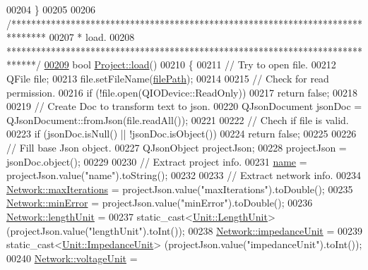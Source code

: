 \begin{DoxyCode}
00204 \}
00205 
00206 \textcolor{comment}{/*******************************************************************************}
00207 \textcolor{comment}{ * load.}
00208 \textcolor{comment}{ ******************************************************************************/}
\hypertarget{project_8cpp_source_l00209}{}\hyperlink{class_project_a1e373892a0383371132ce68fa5f8813d}{00209} \textcolor{keywordtype}{bool} \hyperlink{class_project_a1e373892a0383371132ce68fa5f8813d}{Project::load}()
00210 \{
00211   \textcolor{comment}{// Try to open file.}
00212   QFile file;
00213   file.setFileName(\hyperlink{class_project_a79f30adcefd0b72bd4ac7db724bc9531}{filePath});
00214 
00215   \textcolor{comment}{// Check for read permission.}
00216   \textcolor{keywordflow}{if} (!file.open(QIODevice::ReadOnly))
00217     \textcolor{keywordflow}{return} \textcolor{keyword}{false};
00218 
00219   \textcolor{comment}{// Create Doc to transform text to json.}
00220   QJsonDocument jsonDoc = QJsonDocument::fromJson(file.readAll());
00221 
00222   \textcolor{comment}{// Chech if file is valid.}
00223   \textcolor{keywordflow}{if} (jsonDoc.isNull() || !jsonDoc.isObject())
00224     \textcolor{keywordflow}{return} \textcolor{keyword}{false};
00225 
00226   \textcolor{comment}{// Fill base Json object.}
00227   QJsonObject projectJson;
00228   projectJson = jsonDoc.object();
00229 
00230   \textcolor{comment}{// Extract project info.}
00231   \hyperlink{class_project_a82dd2d1bc38f9fd08c9a811fcaa76b38}{name} = projectJson.value(\textcolor{stringliteral}{"name"}).toString();
00232 
00233   \textcolor{comment}{// Extract network info.}
00234   \hyperlink{group___models_ga318dee060bc577eacd67d332efbbe1b2}{Network::maxIterations} = projectJson.value(\textcolor{stringliteral}{"maxIterations"}).toDouble();
00235   \hyperlink{group___models_gabcdc973129d3dda7572b7a1c388da1b5}{Network::minError} = projectJson.value(\textcolor{stringliteral}{"minError"}).toDouble();
00236   \hyperlink{group___models_gae46c0e2bf39b343875e3c69066fe2652}{Network::lengthUnit} =
00237     \textcolor{keyword}{static\_cast<}\hyperlink{class_unit_a8c8921f7b225ad6063b1cb573425b9a0}{Unit::LengthUnit}\textcolor{keyword}{>} (projectJson.value(\textcolor{stringliteral}{"lengthUnit"}).toInt());
00238   \hyperlink{group___models_ga5f3d72699a723c64a89d22e34df708ff}{Network::impedanceUnit} =
00239     \textcolor{keyword}{static\_cast<}\hyperlink{class_unit_a3747e779c805df24a71961290be3fbdf}{Unit::ImpedanceUnit}\textcolor{keyword}{>} (projectJson.value(\textcolor{stringliteral}{"impedanceUnit"}).toInt());
00240   \hyperlink{group___models_gacde031ef95f5c05565ee35769f2ed89e}{Network::voltageUnit} =

\end{DoxyCode}
